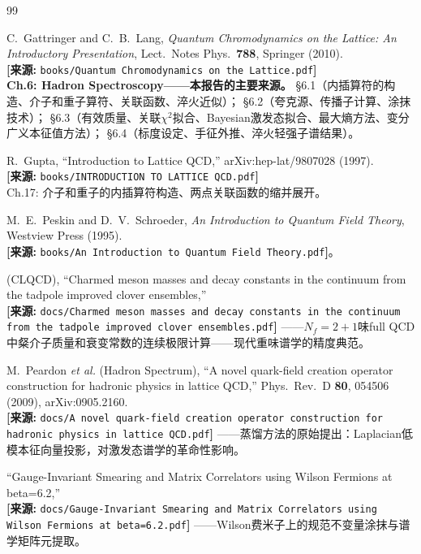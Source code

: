 \documentclass[12pt,a4paper]{ctexart}
\theoremstyle{definition}
\begin{document}
\begin{thebibliography}{99}

C.~Gattringer and C.~B.~Lang,
\textit{Quantum Chromodynamics on the Lattice: An Introductory Presentation},
Lect.\ Notes Phys.\ \textbf{788}, Springer (2010).
\\\textbf{[来源:} \texttt{books/Quantum Chromodynamics on the Lattice.pdf}\textbf{]}
\\\textbf{Ch.6: Hadron Spectroscopy——本报告的主要来源。}
§6.1（内插算符的构造、介子和重子算符、关联函数、淬火近似）；
§6.2（夸克源、传播子计算、涂抹技术）；
§6.3（有效质量、关联$\chi^2$拟合、Bayesian激发态拟合、最大熵方法、变分广义本征值方法）；
§6.4（标度设定、手征外推、淬火轻强子谱结果）。

R.~Gupta,
``Introduction to Lattice QCD,''
arXiv:hep-lat/9807028 (1997).
\\\textbf{[来源:} \texttt{books/INTRODUCTION TO LATTICE QCD.pdf}\textbf{]}
\\Ch.17: 介子和重子的内插算符构造、两点关联函数的缩并展开。

M.~E.~Peskin and D.~V.~Schroeder,
\textit{An Introduction to Quantum Field Theory}, Westview Press (1995).
\\\textbf{[来源:} \texttt{books/An Introduction to Quantum Field Theory.pdf}\textbf{]}。

(CLQCD),
``Charmed meson masses and decay constants in the continuum from the tadpole improved clover ensembles,''
\\\textbf{[来源:} \texttt{docs/Charmed meson masses and decay constants in the continuum from the tadpole improved clover ensembles.pdf}\textbf{]}
——$N_f=2+1$味full QCD中粲介子质量和衰变常数的连续极限计算——现代重味谱学的精度典范。

M.~Peardon \textit{et al.} (Hadron Spectrum),
``A novel quark-field creation operator construction for hadronic physics in lattice QCD,''
Phys.\ Rev.\ D \textbf{80}, 054506 (2009), arXiv:0905.2160.
\\\textbf{[来源:} \texttt{docs/A novel quark-field creation operator construction for hadronic physics in lattice QCD.pdf}\textbf{]}
——蒸馏方法的原始提出：Laplacian低模本征向量投影，对激发态谱学的革命性影响。

``Gauge-Invariant Smearing and Matrix Correlators using Wilson Fermions at beta=6.2,''
\\\textbf{[来源:} \texttt{docs/Gauge-Invariant Smearing and Matrix Correlators using Wilson Fermions at beta=6.2.pdf}\textbf{]}
——Wilson费米子上的规范不变量涂抹与谱学矩阵元提取。


\end{thebibliography}
\end{document}
